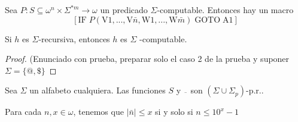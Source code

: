   \begin{proposition}
    Sea \(P:S\subseteq \omega ^{n}\times \Sigma ^{\ast m}\rightarrow \omega \) un predicado \(\Sigma \)-computable.
    Entonces hay un macro
    \[
    \displaystyle \left[ \mathrm{IF}\;P(\mathrm{V}1,...,\mathrm{V}\bar{n},\mathrm{W}1,..., 
    \mathrm{W}\bar{m})\;\mathrm{GOTO}\;\mathrm{A}1\right]
    \]
  \end{proposition}

  \begin{theorem}
    Si \(h\) es \(\Sigma \)-recursiva, entonces \(h\) es \(\Sigma \) -computable.

  \begin{proof}
    (Enunciado con prueba, preparar solo el caso 2 de la prueba y suponer $\Sigma = \{@, \$\}$
  \end{proof}
  \end{theorem}

  \begin{lemma}
    Sea \(\Sigma \) un alfabeto cualquiera. Las funciones \(S\) y \(\overline{\ \;}\) son
    \((\Sigma \cup \Sigma _{p})\)-p.r..
  \end{lemma}

  \begin{lemma}
    Para cada \(n,x\in \omega \), tenemos que \( \left\vert \bar{n}\right\vert \leq x\) si y solo si \(n\leq 10^{x}-1\)
  \end{lemma}

